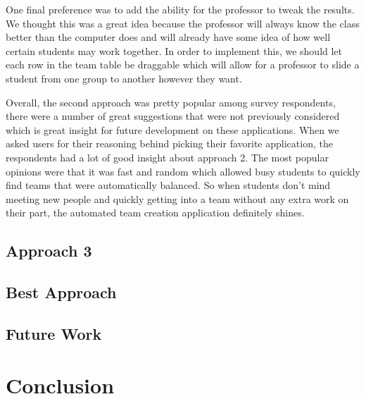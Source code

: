 \documentclass[conference]{IEEEtran}
\begin{document}
One final preference was to add the ability for the professor to tweak the results. We thought this was a great idea because the professor will always know the class better than the computer does and will already have some idea of how well certain students may work together. In order to implement this, we should let each row in the team table be draggable which will allow for a professor to slide a student from one group to another however they want. 

Overall, the second approach was pretty popular among survey respondents, there were a number of great suggestions that were not previously considered which is great insight for future development on these applications. When we asked users for their reasoning behind picking their favorite application, the respondents had a lot of good insight about approach 2. The most popular opinions were that it was fast and random which allowed busy students to quickly find teams that were automatically balanced. So when students don't mind meeting new people and quickly getting into a team without any extra work on their part, the automated team creation application definitely shines. 

\subsection{Approach 3}



\subsection{Best Approach}
\blindtext

\subsection{Future Work}
\blindtext

\section{Conclusion}
\blindtext
\end{document}
